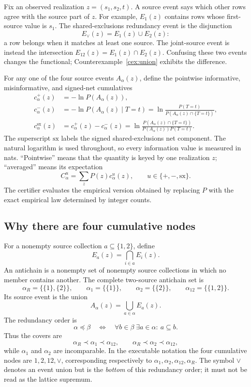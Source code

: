 \documentclass[11pt]{article}
\theoremstyle{definition}
\newcommand{\sx}{\mathrm{sx}}
\begin{document}
Fix an observed realization $z=(s_1,s_2,t)$.  A source event says which other rows agree with the
source part of $z$.  For example, $E_1(z)$ contains rows whose first-source value is $s_1$.
The shared-exclusions redundancy event is the disjunction
\begin{equation}
  E_\vee(z)=E_1(z)\cup E_2(z):
\end{equation}
a row belongs when it matches at least one source.  The joint-source event is instead the
intersection $E_{12}(z)=E_1(z)\cap E_2(z)$.  Confusing these two events changes the functional;
Counterexample~\ref{cex:union} exhibits the difference.

For any one of the four source events $A_\alpha(z)$, define the pointwise informative,
misinformative, and signed-net cumulatives
\begin{align}
  c^+_\alpha(z)
    &=-\ln P\!\left(A_\alpha(z)\right),\label{eq:local-plus-primer}\\
  c^-_\alpha(z)
    &=-\ln P\!\left(A_\alpha(z)\mid T=t\right)
      =\ln\!\frac{P(T=t)}
                    {P(A_\alpha(z)\cap\{T=t\})},\label{eq:local-minus-primer}\\
  c^\sx_\alpha(z)
    &=c^+_\alpha(z)-c^-_\alpha(z)
      =\ln\!\frac{P(A_\alpha(z)\cap\{T=t\})}
                    {P(A_\alpha(z))P(T=t)}.\label{eq:local-net-primer}
\end{align}
The superscript $\sx$ labels the signed shared-exclusions net component.  The natural logarithm is
used throughout, so every information value is measured in nats.  ``Pointwise'' means that the
quantity is keyed by one realization $z$; ``averaged'' means its expectation
\begin{equation}
  C^u_\alpha=\sum_z P(z)c^u_\alpha(z),
  \qquad u\in\{+,-,\sx\}.
\end{equation}
The certifier evaluates the empirical version obtained by replacing $P$ with the exact empirical
law determined by integer counts.

\subsection{Why there are four cumulative nodes}

For a nonempty source collection \(a\subseteq\{1,2\}\), define
\[
  E_a(z)=\bigcap_{i\in a}E_i(z).
\]
An antichain is a nonempty set of nonempty source collections in which no member contains another.
The complete two-source antichain set is
\[
  \alpha_R=\{\{1\},\{2\}\},\qquad
  \alpha_1=\{\{1\}\},\qquad
  \alpha_2=\{\{2\}\},\qquad
  \alpha_{12}=\{\{1,2\}\}.
\]
Its source event is the union
\[
  A_\alpha(z)=\bigcup_{a\in\alpha}E_a(z).
\]
The redundancy order is
\[
  \alpha\preceq\beta
  \quad\Longleftrightarrow\quad
  \forall b\in\beta\;\exists a\in\alpha:\ a\subseteq b.
\]
Thus the covers are
\[
  \alpha_R\prec\alpha_1\prec\alpha_{12},
  \qquad
  \alpha_R\prec\alpha_2\prec\alpha_{12},
\]
while \(\alpha_1\) and \(\alpha_2\) are incomparable.  In the executable notation the four
cumulative nodes are \(1,2,12,\vee\), corresponding respectively to
\(\alpha_1,\alpha_2,\alpha_{12},\alpha_R\).  The symbol \(\vee\) denotes an event union but is the
\emph{bottom} of this redundancy order; it must not be read as the lattice supremum.
\end{document}
